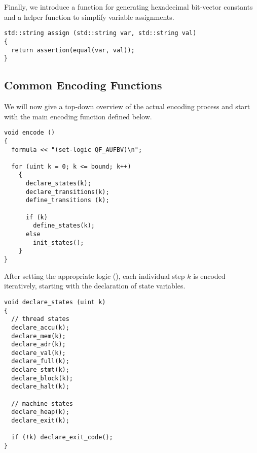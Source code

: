 \noindent
Finally, we introduce a function  for generating hexadecimal bit-vector constants and a helper function to simplify variable assignments.

%
%

\begin{lstlisting}[style=c++]
std::string assign (std::string var, std::string val)
{
  return assertion(equal(var, val));
}
\end{lstlisting}


\subsection*{Common Encoding Functions}

We will now give a top-down overview of the actual encoding process  and start with the main encoding function defined below.

\begin{lstlisting}[style=c++]
void encode ()
{
  formula << "(set-logic QF_AUFBV)\n";

  for (uint k = 0; k <= bound; k++)
    {
      declare_states(k);
      declare_transitions(k);
      define_transitions (k);

      if (k)
        define_states(k);
      else
        init_states();
    }
}
\end{lstlisting}

\noindent
After setting the appropriate logic (), each individual step $k$ is encoded iteratively, starting with the declaration of state variables.


\begin{lstlisting}[style=c++]
void declare_states (uint k)
{
  // thread states
  declare_accu(k);
  declare_mem(k);
  declare_adr(k);
  declare_val(k);
  declare_full(k);
  declare_stmt(k);
  declare_block(k);
  declare_halt(k);

  // machine states
  declare_heap(k);
  declare_exit(k);

  if (!k) declare_exit_code();
}
\end{lstlisting}

